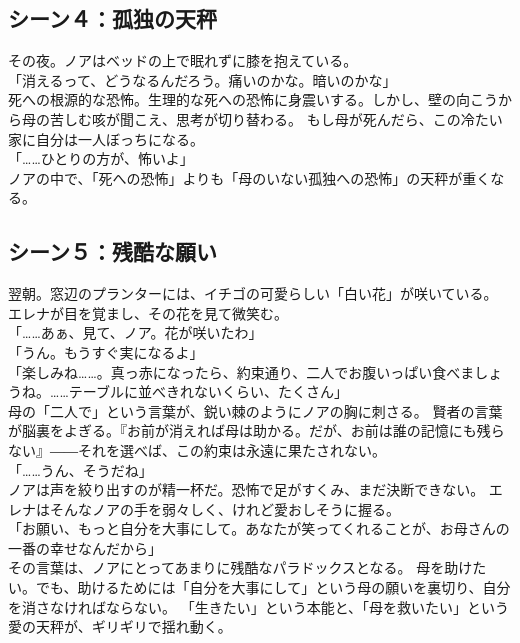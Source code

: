 \subsection{シーン４：孤独の天秤}
その夜。ノアはベッドの上で眠れずに膝を抱えている。
\\「消えるって、どうなるんだろう。痛いのかな。暗いのかな」\\
死への根源的な恐怖。生理的な死への恐怖に身震いする。しかし、壁の向こうから母の苦しむ咳が聞こえ、思考が切り替わる。
もし母が死んだら、この冷たい家に自分は一人ぼっちになる。
\\「……ひとりの方が、怖いよ」\\
ノアの中で、「死への恐怖」よりも「母のいない孤独への恐怖」の天秤が重くなる。

\subsection{シーン５：残酷な願い}
翌朝。窓辺のプランターには、イチゴの可愛らしい「白い花」が咲いている。
エレナが目を覚まし、その花を見て微笑む。
\\「……あぁ、見て、ノア。花が咲いたわ」
\\「うん。もうすぐ実になるよ」
\\「楽しみね……。真っ赤になったら、約束通り、二人でお腹いっぱい食べましょうね。……テーブルに並べきれないくらい、たくさん」\\
母の「二人で」という言葉が、鋭い棘のようにノアの胸に刺さる。
賢者の言葉が脳裏をよぎる。『お前が消えれば母は助かる。だが、お前は誰の記憶にも残らない』――それを選べば、この約束は永遠に果たされない。
\\「……うん、そうだね」\\
ノアは声を絞り出すのが精一杯だ。恐怖で足がすくみ、まだ決断できない。
エレナはそんなノアの手を弱々しく、けれど愛おしそうに握る。
\\「お願い、もっと自分を大事にして。あなたが笑ってくれることが、お母さんの一番の幸せなんだから」\\
その言葉は、ノアにとってあまりに残酷なパラドックスとなる。
母を助けたい。でも、助けるためには「自分を大事にして」という母の願いを裏切り、自分を消さなければならない。
「生きたい」という本能と、「母を救いたい」という愛の天秤が、ギリギリで揺れ動く。

